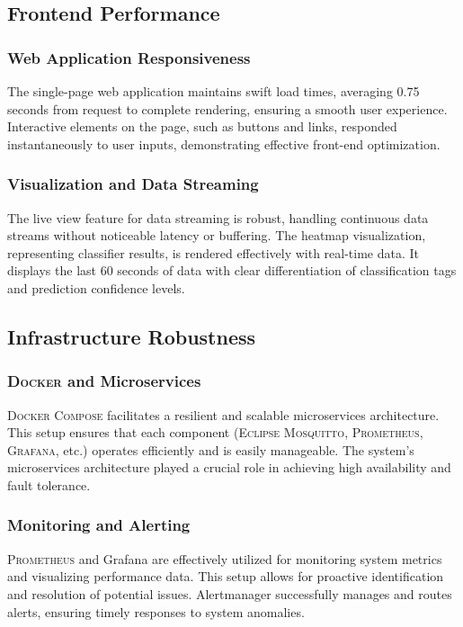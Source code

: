 \subsection{Frontend Performance}

\subsubsection{Web Application Responsiveness}

The single-page web application maintains swift load times, averaging 0.75 seconds from request to complete rendering, ensuring a smooth user experience. Interactive elements on the page, such as buttons and links, responded instantaneously to user inputs, demonstrating effective front-end optimization.

\subsubsection{Visualization and Data Streaming}

The live view feature for data streaming is robust, handling continuous data streams without noticeable latency or buffering. The heatmap visualization, representing classifier results, is rendered effectively with real-time data. It displays the last 60 seconds of data with clear differentiation of classification tags and prediction confidence levels.
\subsection{Infrastructure Robustness}

\subsubsection{\textsc{Docker} and Microservices}

\textsc{Docker Compose} facilitates a resilient and scalable microservices architecture. This setup ensures that each component (\textsc{Eclipse Mosquitto}, \textsc{Prometheus}, \textsc{Grafana}, etc.) operates efficiently and is easily manageable. The system's microservices architecture played a crucial role in achieving high availability and fault tolerance.

\subsubsection{Monitoring and Alerting}

\textsc{Prometheus} and Grafana are effectively utilized for monitoring system metrics and visualizing performance data. This setup allows for proactive identification and resolution of potential issues. Alertmanager successfully manages and routes alerts, ensuring timely responses to system anomalies.

